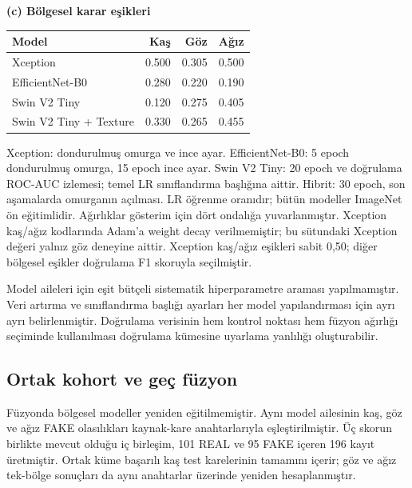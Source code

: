 \documentclass[a4paper]{elektr}
\begin{document}
\begin{table}[!htbp]
\begin{minipage}{15.8cm}
\par\medskip
\textbf{(c) Bölgesel karar eşikleri}\par\smallskip
\begin{tabular*}{\linewidth}{@{\extracolsep{\fill}}lrrr@{}}\toprule
Model & Kaş & Göz & Ağız\\\midrule
Xception & 0.500 & 0.305 & 0.500\\
EfficientNet-B0 & 0.280 & 0.220 & 0.190\\
Swin V2 Tiny & 0.120 & 0.275 & 0.405\\
Swin V2 Tiny + Texture & 0.330 & 0.265 & 0.455\\\bottomrule
\end{tabular*}
\par\smallskip\begin{minipage}{\linewidth}\small
Xception: dondurulmuş omurga ve ince ayar. EfficientNet-B0: 5 epoch dondurulmuş omurga, 15 epoch ince ayar. Swin V2 Tiny: 20 epoch ve doğrulama ROC-AUC izlemesi; temel LR sınıflandırma başlığına aittir. Hibrit: 30 epoch, son aşamalarda omurganın açılması. LR öğrenme oranıdır; bütün modeller ImageNet ön eğitimlidir. Ağırlıklar gösterim için dört ondalığa yuvarlanmıştır. Xception kaş/ağız kodlarında Adam'a weight decay verilmemiştir; bu sütundaki Xception değeri yalnız göz deneyine aittir. Xception kaş/ağız eşikleri sabit 0,50; diğer bölgesel eşikler doğrulama F1 skoruyla seçilmiştir.
\end{minipage}\end{minipage}\end{table}

Model aileleri için eşit bütçeli sistematik hiperparametre araması yapılmamıştır. Veri artırma ve sınıflandırma başlığı ayarları her model yapılandırması için ayrı ayrı belirlenmiştir. Doğrulama verisinin hem kontrol noktası hem füzyon ağırlığı seçiminde kullanılması doğrulama kümesine uyarlama yanlılığı oluşturabilir.

\subsection{Ortak kohort ve geç füzyon}
Füzyonda bölgesel modeller yeniden eğitilmemiştir. Aynı model ailesinin kaş, göz ve ağız FAKE olasılıkları kaynak-kare anahtarlarıyla eşleştirilmiştir. Üç skorun birlikte mevcut olduğu iç birleşim, 101 REAL ve 95 FAKE içeren 196 kayıt üretmiştir. Ortak küme başarılı kaş test karelerinin tamamını içerir; göz ve ağız tek-bölge sonuçları da aynı anahtarlar üzerinde yeniden hesaplanmıştır.
\end{document}
